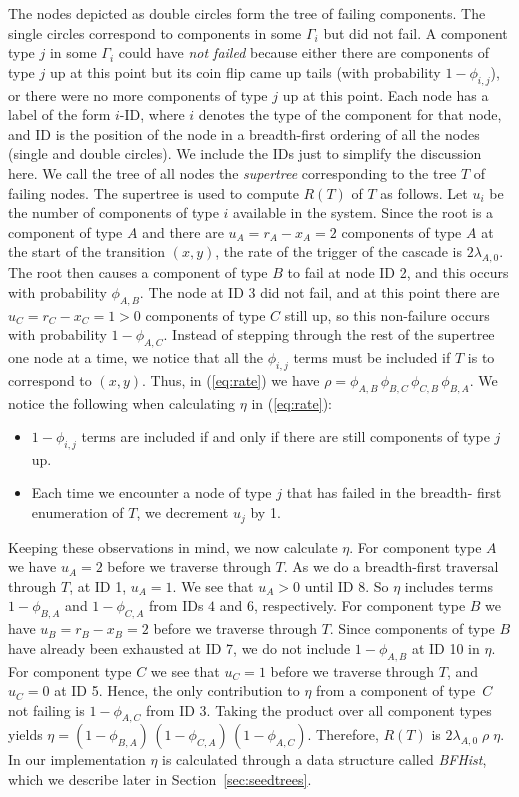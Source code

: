 \documentclass[12pt]{article}
\newcommand{\varName}[1]{\textrm{\it#1}}
\begin{document}
The nodes depicted as double circles form the tree of failing components. The
single circles correspond to components in some $\Gamma_i$ but did not fail.  A
component type $j$ in some $\Gamma_i$ could have \textit{not failed} because
either there are components of type $j$ up at this point but its coin flip came
up tails (with probability $1 - \phi_{i, j}$), or there were no more components
of type $j$ up at this point. Each node has a label of the form $i$-ID, where
$i$ denotes the type of the component for that node, and ID is the position of
the node in a breadth-first ordering of all the nodes (single and double
circles). We include the IDs just to simplify the discussion here. We call the
tree of all nodes the \textit{supertree} corresponding to the tree $T$ of
failing nodes. The supertree is used to compute $R(T)$ of $T$ as follows. Let
$u_i$ be the number of components of type $i$ available in the system. Since the
root is a component of type $A$ and there are $u_A = r_A - x_A = 2$ components
of type $A$ at the start of the transition $(x, y)$, the rate of the trigger of
the cascade is $2 \lambda_{A, 0}$. The root then causes a component of type $B$
to fail at node ID 2, and this occurs with probability $\phi_{A, B}$. The node
at ID 3 did not fail, and at this point there are $u_C = r_C - x_C = 1 > 0$
components of type $C$ still up, so this non-failure occurs with probability $1
- \phi_{A,C}$. Instead of stepping through the rest of the supertree one node at
a time, we notice that all the $\phi_{i, j}$ terms must be included if $T$ is to
correspond to $(x, y)$. Thus, in (\ref{eq:rate}) we have $\rho = \phi_{A, B} \,
\phi_{B, C} \, \phi_{C, B} \, \phi_{B, A}$. We notice the following when
calculating $\eta$ in (\ref{eq:rate}):
\begin{itemize} 
\item $1 - \phi_{i, j}$ terms are included if and only if there are still
components of type $j$ up.
\item Each time we encounter a node of type $j$ that has failed in the breadth-
first enumeration of $T$, we decrement $u_j$ by 1.
\end{itemize}
Keeping these observations in mind, we now calculate $\eta$. For component type
$A$ we have $u_A = 2$ before we traverse through $T$. As we do a breadth-first
traversal through $T$, at ID 1, $u_A = 1$. We see that $u_A > 0$ until ID 8. So
$\eta$ includes terms $1 - \phi_{B, A}$ and $1 - \phi_{C, A}$ from IDs $4$ and
$6$, respectively. For component type $B$ we have $u_B = r_B - x_B  = 2$ before
we traverse through $T$. Since components of type $B$ have already been
exhausted at ID 7, we do not include $1 - \phi_{A, B}$ at ID 10 in $\eta$. For
component type $C$ we see that $u_C = 1$ before we traverse through $T$, and
$u_C = 0$ at ID 5. Hence, the only contribution to $\eta$ from a component of
type~$C$ not failing is $1 - \phi_{A, C}$ from ID 3. Taking the product over all
component types yields $\eta = (1 - \phi_{B, A}) \, (1 - \phi_{C, A}) \, (1 -
\phi_{A,C})$. Therefore, $R(T)$ is $2 \lambda_{A, 0} \; \rho \; \eta$. In our
implementation $\eta$ is calculated through a data structure called
\varName{BFHist}, which we describe later in Section~\ref{sec:seedtrees}.
\end{document}
